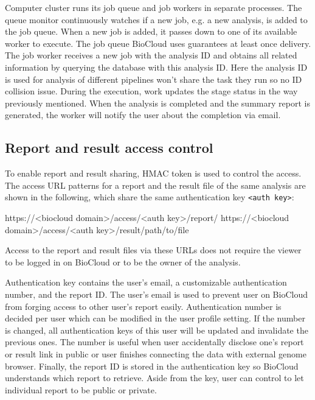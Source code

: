 Computer cluster runs its job queue and job workers in separate processes. The
queue monitor continuously watches if a new job, e.g. a new analysis, is added
to the job queue. When a new job is added, it passes down to one of its
available worker to execute. The job queue BioCloud uses guarantees at least
once delivery. The job worker receives a new job with the analysis ID and
obtains all related information by querying the database with this analysis ID.
Here the analysis ID is used for analysis of different pipelines won't share
the task they run so no ID collision issue. During the execution, work updates
the stage status in the way previously mentioned. When the analysis is
completed and the summary report is generated, the worker will notify the user
about the completion via email.


\subsection{Report and result access control}

To enable report and result sharing, HMAC token is used to control the access.
The access URL patterns for a report and the result file of the same analysis
are shown in the following, which share the same authentication key
\texttt{<auth key>}:

\begin{CVerbatim}[fontsize=\small]
https://<biocloud domain>/access/<auth key>/report/
https://<biocloud domain>/access/<auth key>/result/path/to/file
\end{CVerbatim}

\vspace{-1em}\noindent
Access to the report and result files via these URLs does not require the
viewer to be logged in on BioCloud or to be the owner of the analysis.

Authentication key contains the user's email, a customizable authentication
number, and the report ID. The user's email is used to prevent user on BioCloud
from forging access to other user's report easily. Authentication number is
decided per user which can be modified in the user profile setting. If the
number is changed, all authentication keys of this user will be updated and
invalidate the previous ones. The number is useful when user accidentally
disclose one's report or result link in public or user finishes connecting the
data with external genome browser. Finally, the report ID is stored in the
authentication key so BioCloud understands which report to retrieve. Aside from
the key, user can control to let individual report to be public or private.

